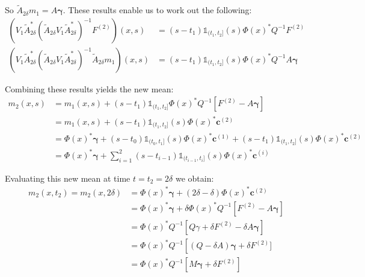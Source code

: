 \documentclass{article}
\theoremstyle{definition}
\theoremstyle{remark}
\theoremstyle{remark}
\begin{document}
So $\tilde{A}_{2\delta}m_1=A\boldsymbol{\gamma}$. These results enable us to work out the following:
\begin{align*}
  (V_{1}\tilde{A}_{2\delta}^{*}(\tilde{A}_{2\delta}V_{1}\tilde{A}_{2\delta}^{*})^{-1}F^{(2)})(x,s) &= (s-t_{1})\mathbb{1}_{(t_1,t_2]}(s)\Phi(x)^{*}Q^{-1}F^{(2)} \\
  (V_{1}\tilde{A}_{2\delta}^{*}(\tilde{A}_{2\delta}V_{1}\tilde{A}_{2\delta}^{*})^{-1}\tilde{A}_{2\delta}m_1)(x,s) &= (s-t_1)\mathbb{1}_{(t_1,t_2]}(s)\Phi(x)^{*}Q^{-1}A\boldsymbol{\gamma}
\end{align*}

\noindent Combining these results yields the new mean:
\begin{align*}
  m_{2}(x,s) &= m_1(x,s)+(s-t_1)\mathbb{1}_{(t_1,t_2]}\Phi(x)^{*}Q^{-1}\left[F^{(2)}-A\boldsymbol{\gamma}\right] \\
  &= m_1(x,s) + (s-t_1)\mathbb{1}_{(t_1,t_2]}(s)\Phi(x)^{*}\boldsymbol{c}^{(2)} \\
  &= \Phi(x)^{*}\boldsymbol{\gamma}+(s-t_0)\mathbb{1}_{(t_0,t_1]}(s)\Phi(x)^{*}\boldsymbol{c}^{(1)} + (s-t_1)\mathbb{1}_{(t_1,t_2]}(s)\Phi(x)^{*}\boldsymbol{c}^{(2)} \\
  &= \Phi(x)^{*}\boldsymbol{\gamma} + \sum_{i=1}^{2}(s-t_{i-1})\mathbb{1}_{(t_{i-1},t_i]}(s)\Phi(x)^{*}\boldsymbol{c}^{(i)}
\end{align*}

\noindent Evaluating this new mean at time $t=t_2=2\delta$ we obtain:
\begin{align*}
  m_2(x,t_2)=m_2(x,2\delta) &= \Phi(x)^{*}\boldsymbol{\gamma} + (2\delta-\delta)\Phi(x)^{*}\boldsymbol{c}^{(2)} \\
  &= \Phi(x)^{*}\boldsymbol{\gamma} + \delta\Phi(x)^{*}Q^{-1}\left[F^{(2)}-A\boldsymbol{\gamma}\right] \\
  &= \Phi(x)^{*}Q^{-1}\left[Q\gamma+\delta F^{(2)}-\delta A\boldsymbol{\gamma}\right] \\
  &= \Phi(x)^{*}Q^{-1}\left[(Q-\delta A)\boldsymbol{\gamma}+\delta F^{(2)}] \\
  &= \Phi(x)^{*}Q^{-1}\left[M\boldsymbol{\gamma}+\delta F^{(2)}\right]
\end{align*}
\end{document}
